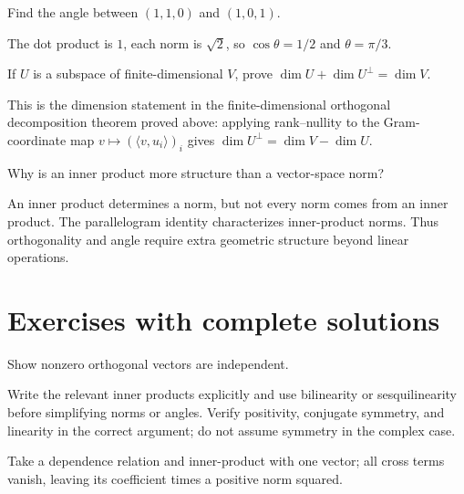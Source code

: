 \begin{problem}\label{prob:i13-problem-10}
Find the angle between $(1,1,0)$ and $(1,0,1)$.
\end{problem}
\begin{solution}
The dot product is $1$, each norm is $\sqrt2$, so $\cos\theta=1/2$ and $\theta=\pi/3$.
\end{solution}

\begin{problem}\label{prob:i13-problem-11}
If $U$ is a subspace of finite-dimensional $V$, prove $\dim U+\dim U^\perp=\dim V$.
\end{problem}
\begin{solution}
This is the dimension statement in the finite-dimensional orthogonal decomposition theorem proved above: applying rank--nullity to the Gram-coordinate map $v\mapsto(\langle v,u_i\rangle)_i$ gives $\dim U^\perp=\dim V-\dim U$.
\end{solution}

\begin{problem}\label{prob:i13-problem-12}
Why is an inner product more structure than a vector-space norm?
\end{problem}
\begin{solution}
An inner product determines a norm, but not every norm comes from an inner product. The parallelogram identity characterizes inner-product norms. Thus orthogonality and angle require extra geometric structure beyond linear operations.
\end{solution}


\section{Exercises with complete solutions}

\begin{exercise}\label{exr:i13-01}
Show nonzero orthogonal vectors are independent.
\end{exercise}
\begin{hint}
Write the relevant inner products explicitly and use bilinearity or sesquilinearity before simplifying norms or angles. Verify positivity, conjugate symmetry, and linearity in the correct argument; do not assume symmetry in the complex case.
\end{hint}
\begin{solution}
Take a dependence relation and inner-product with one vector; all cross terms vanish, leaving its coefficient times a positive norm squared.
\end{solution}

